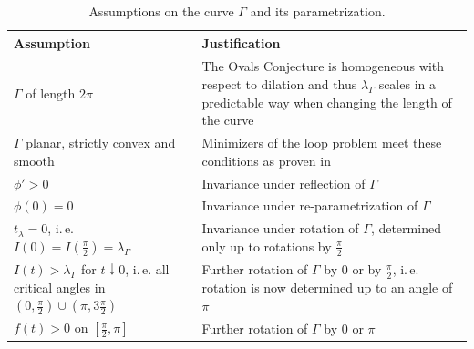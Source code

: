 \documentclass{article}
\newcommand{\ite}{i.\,e.\xspace}
\begin{document}
\begin{table}[h!] 
    \centering
    \begin{tabularx}{\linewidth}{|X|X|} 
        \hline
        \textbf{Assumption} & \textbf{Justification} \\ \hline
        $\Gamma$ of length $2\pi$ & The Ovals Conjecture is homogeneous with respect to dilation and thus $\lambda_\Gamma$ scales in a predictable way when changing the length of the curve\\ \hline
        $\Gamma$ planar, strictly convex and smooth & Minimizers of the loop problem meet these conditions as proven in \cite{Denzler:Existence}  \\ \hline
        $\phi' > 0$ & Invariance under reflection of $\Gamma$ \\ \hline
        $\phi(0) = 0$ & Invariance under re-parametrization of $\Gamma$ \\ \hline
        $t_\lambda = 0$, \ite $I(0) = I(\frac{\pi}{2}) = \lambda_\Gamma$ & Invariance under rotation of $\Gamma$, determined only up to rotations by $\frac\pi 2$ \\ \hline
        $I(t) > \lambda_\Gamma$ for $t \downarrow 0$, \ite all critical angles in $(0,\frac{\pi}{2}) \cup (\pi,3\frac{\pi}{2})$ & Further rotation of $\Gamma$ by $0$ or by $\frac\pi 2$, \ite rotation is now determined up to an angle of $\pi$ \\ \hline
        $f(t) > 0$ on $[\frac{\pi}{2},\pi]$ & Further rotation of $\Gamma$ by $0$ or $\pi$\\ \hline
    \end{tabularx}
    \caption{Assumptions on the curve $\Gamma$ and its parametrization.}
    \label{tab:assumptions}
\end{table}

\printbibliography 
\end{document}
